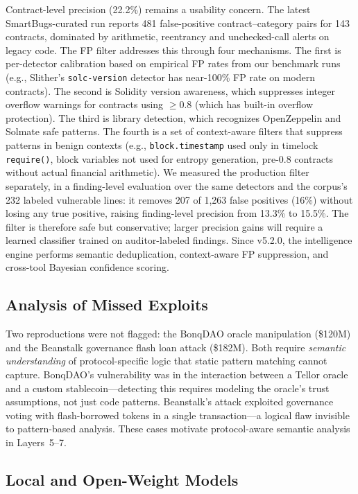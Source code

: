 \documentclass[conference]{IEEEtran}
\begin{document}
Contract-level precision (22.2\%) remains a usability concern. The latest SmartBugs-curated run reports 481 false-positive contract--category pairs for 143 contracts, dominated by arithmetic, reentrancy and unchecked-call alerts on legacy code. The FP filter addresses this through four mechanisms. The first is per-detector calibration based on empirical FP rates from our benchmark runs (e.g., Slither's \texttt{solc-version} detector has near-100\% FP rate on modern contracts). The second is Solidity version awareness, which suppresses integer overflow warnings for contracts using $\geq$0.8 (which has built-in overflow protection). The third is library detection, which recognizes OpenZeppelin and Solmate safe patterns. The fourth is a set of context-aware filters that suppress patterns in benign contexts (e.g., \texttt{block.timestamp} used only in timelock \texttt{require()}, block variables not used for entropy generation, pre-0.8 contracts without actual financial arithmetic). We measured the production filter separately, in a finding-level evaluation over the same detectors and the corpus's 232 labeled vulnerable lines: it removes 207 of 1,263 false positives (16\%) without losing any true positive, raising finding-level precision from 13.3\% to 15.5\%. The filter is therefore safe but conservative; larger precision gains will require a learned classifier trained on auditor-labeled findings. Since v5.2.0, the intelligence engine performs semantic deduplication, context-aware FP suppression, and cross-tool Bayesian confidence scoring.

\subsection{Analysis of Missed Exploits}

Two reproductions were not flagged: the BonqDAO oracle manipulation (\$120M) and the Beanstalk governance flash loan attack (\$182M). Both require \emph{semantic understanding} of protocol-specific logic that static pattern matching cannot capture. BonqDAO's vulnerability was in the interaction between a Tellor oracle and a custom stablecoin---detecting this requires modeling the oracle's trust assumptions, not just code patterns. Beanstalk's attack exploited governance voting with flash-borrowed tokens in a single transaction---a logical flaw invisible to pattern-based analysis. These cases motivate protocol-aware semantic analysis in Layers~5--7.

\subsection{Local and Open-Weight Models}
\end{document}
